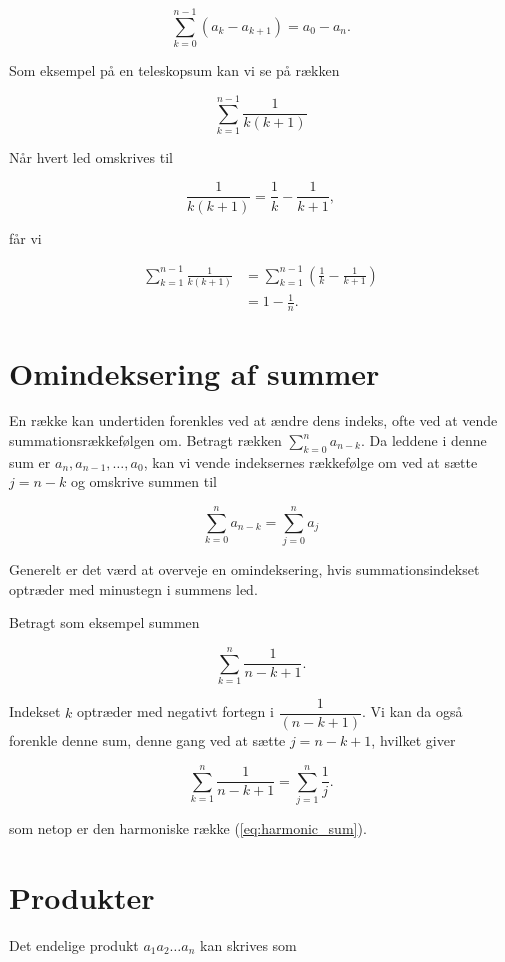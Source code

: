 \[
    \sum_{k=0}^{n-1}\left(a_k-a_{k+1}\right)=a_0-a_n .
\]

Som eksempel på en teleskopsum kan vi se på rækken

\[
\sum_{k=1}^{n-1} \frac{1}{k(k+1)}
\]

Når hvert led omskrives til

\[
\frac{1}{k(k+1)}=\frac{1}{k}-\frac{1}{k+1},
\]

får vi

\begin{align}
\sum_{k=1}^{n-1} \frac{1}{k(k+1)} & =\sum_{k=1}^{n-1}\left(\frac{1}{k}-\frac{1}{k+1}\right) \nonumber \\
& =1-\frac{1}{n} . \label{eq:telescoping-example}
\end{align}

\section*{Omindeksering af summer}
En række kan undertiden forenkles ved at ændre dens indeks, ofte ved at vende summationsrækkefølgen om. Betragt rækken $\sum_{k=0}^n a_{n-k}$. Da leddene i denne sum er $a_n, a_{n-1}, \ldots, a_0$, kan vi vende indeksernes rækkefølge om ved at sætte $j=n-k$ og omskrive summen til

$$
\sum_{k=0}^n a_{n-k}=\sum_{j=0}^n a_j
$$


Generelt er det værd at overveje en omindeksering, hvis summationsindekset optræder med minustegn i summens led.

Betragt som eksempel summen

\begin{equation}
    \sum_{k=1}^n \frac{1}{n-k+1} . \label{eq:reindexing-example}
\end{equation}


Indekset $k$ optræder med negativt fortegn i $\dfrac{1}{(n-k+1)}$. Vi kan da også forenkle denne sum, denne gang ved at sætte $j=n-k+1$, hvilket giver

\begin{equation}
    \sum_{k=1}^n \frac{1}{n-k+1}=\sum_{j=1}^n \frac{1}{j}. \label{eq:reindexing-example-solution}
\end{equation}

som netop er den harmoniske række (\ref{eq:harmonic_sum}).

\section*{Produkter}
Det endelige produkt $a_1 a_2 \ldots a_n$ kan skrives som

